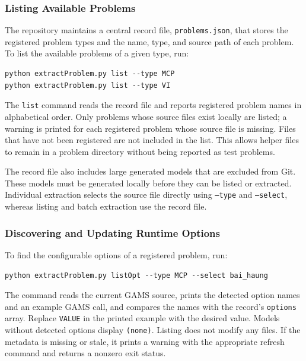 \subsubsection{Listing Available Problems}

The repository maintains a central record file, \texttt{problems.json}, that stores the registered problem types and the name, type, and source path of each problem. To list the available problems of a given type, run:

\begin{verbatim}
python extractProblem.py list --type MCP
python extractProblem.py list --type VI
\end{verbatim}

The \texttt{list} command reads the record file and reports registered problem names in alphabetical order. Only problems whose source files exist locally are listed; a warning is printed for each registered problem whose source file is missing. Files that have not been registered are not included in the list. This allows helper files to remain in a problem directory without being reported as test problems.

The record file also includes large generated models that are excluded from Git. These models must be generated locally before they can be listed or extracted. Individual extraction selects the source file directly using \texttt{--type} and \texttt{--select}, whereas listing and batch extraction use the record file.

\subsubsection{Discovering and Updating Runtime Options}

To find the configurable options of a registered problem, run:

\begin{verbatim}
python extractProblem.py listOpt --type MCP --select bai_haung
\end{verbatim}

The command reads the current GAMS source, prints the detected option names and an example GAMS call, and compares the names with the record's \texttt{options} array. Replace \texttt{VALUE} in the printed example with the desired value. Models without detected options display \texttt{(none)}. Listing does not modify any files. If the metadata is missing or stale, it prints a warning with the appropriate refresh command and returns a nonzero exit status.

